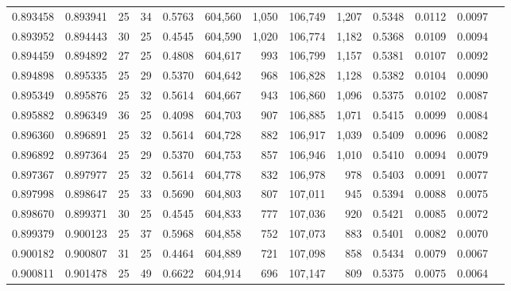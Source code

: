 \begin{tabular}{rrrrrrrrrrrrr}
0.893458 & 0.893941 &    25 &  34 &                                     0.5763 & 604,560 &   1,050 & 106,749 &   1,207 & 0.5348 & 0.0112 & 0.0097 \\
0.893952 & 0.894443 &    30 &  25 &                                     0.4545 & 604,590 &   1,020 & 106,774 &   1,182 & 0.5368 & 0.0109 & 0.0094 \\
0.894459 & 0.894892 &    27 &  25 &                                     0.4808 & 604,617 &     993 & 106,799 &   1,157 & 0.5381 & 0.0107 & 0.0092 \\
0.894898 & 0.895335 &    25 &  29 &                                     0.5370 & 604,642 &     968 & 106,828 &   1,128 & 0.5382 & 0.0104 & 0.0090 \\
0.895349 & 0.895876 &    25 &  32 &                                     0.5614 & 604,667 &     943 & 106,860 &   1,096 & 0.5375 & 0.0102 & 0.0087 \\
0.895882 & 0.896349 &    36 &  25 &                                     0.4098 & 604,703 &     907 & 106,885 &   1,071 & 0.5415 & 0.0099 & 0.0084 \\
0.896360 & 0.896891 &    25 &  32 &                                     0.5614 & 604,728 &     882 & 106,917 &   1,039 & 0.5409 & 0.0096 & 0.0082 \\
0.896892 & 0.897364 &    25 &  29 &                                     0.5370 & 604,753 &     857 & 106,946 &   1,010 & 0.5410 & 0.0094 & 0.0079 \\
0.897367 & 0.897977 &    25 &  32 &                                     0.5614 & 604,778 &     832 & 106,978 &     978 & 0.5403 & 0.0091 & 0.0077 \\
0.897998 & 0.898647 &    25 &  33 &                                     0.5690 & 604,803 &     807 & 107,011 &     945 & 0.5394 & 0.0088 & 0.0075 \\
0.898670 & 0.899371 &    30 &  25 &                                     0.4545 & 604,833 &     777 & 107,036 &     920 & 0.5421 & 0.0085 & 0.0072 \\
0.899379 & 0.900123 &    25 &  37 &                                     0.5968 & 604,858 &     752 & 107,073 &     883 & 0.5401 & 0.0082 & 0.0070 \\
0.900182 & 0.900807 &    31 &  25 &                                     0.4464 & 604,889 &     721 & 107,098 &     858 & 0.5434 & 0.0079 & 0.0067 \\
0.900811 & 0.901478 &    25 &  49 &                                     0.6622 & 604,914 &     696 & 107,147 &     809 & 0.5375 & 0.0075 & 0.0064 \\

\end{tabular}
